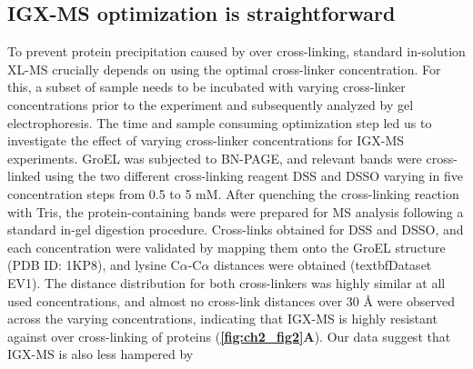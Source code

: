 \subsection*{IGX-MS optimization is straightforward}
To prevent protein precipitation caused by over cross-linking, standard in-solution XL-MS crucially depends on using the optimal cross-linker concentration. For this, a subset of sample needs to be incubated with varying cross-linker concentrations prior to the experiment and subsequently analyzed by gel electrophoresis. The time and sample consuming optimization step led us to investigate the effect of varying cross-linker concentrations for IGX-MS experiments. GroEL was subjected to BN-PAGE, and relevant bands were cross-linked using the two different cross-linking reagent DSS and DSSO varying in five concentration steps from 0.5 to 5 mM. After quenching the cross-linking reaction with Tris, the protein-containing bands were prepared for MS analysis following a standard in-gel digestion procedure. Cross-links obtained for DSS and DSSO, and each concentration were validated by mapping them onto the GroEL structure (PDB ID: 1KP8), and lysine C$\alpha$-C$\alpha$ distances were obtained (textbf{Dataset EV1}). The distance distribution for both cross-linkers was highly similar at all used concentrations, and almost no cross-link distances over 30 Å were observed across the varying concentrations, indicating that IGX-MS is highly resistant against over cross-linking of proteins (\textbf{\autoref{fig:ch2_fig2}A}). Our data suggest that IGX-MS is also less hampered by\\


